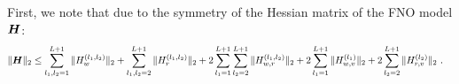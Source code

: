 
First, we note that due to the symmetry of the Hessian matrix of the FNO model ${\bm{H}}$:
\begin{align}
\label{eq:Hessian_big}
    \| {\bm{H}} \|_2 & \leq \sum_{l_1,l_2=1}^{L+1} \| H_{w}^{(l_1,l_2)} \|_2 + \sum_{l_1,l_2=2}^{L+1} \| H_{r}^{(l_1,l_2)} \|_2 + 2 \sum_{l_1=1}^{L+1} \sum_{l_2=2}^{L+1} \| H_{w,r}^{(l_1,l_2)} \|_2 
    + 2 \sum_{l_1=1}^{L+1} \| H_{w,v}^{(l_1)} \|_2 + 2 \sum_{l_2=2}^{L+1} \| H_{r,v}^{(l_2)} \|_2~.
\end{align}


